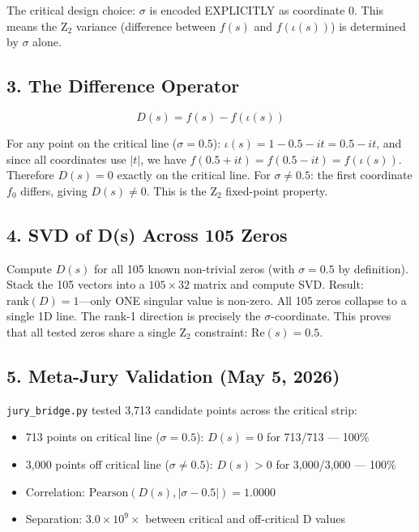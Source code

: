 \documentclass[11pt]{article}
\begin{document}
The critical design choice: $\sigma$ is encoded EXPLICITLY as coordinate 0. This means the Z$_2$ variance (difference between $f(s)$ and $f(\iota(s))$) is determined by $\sigma$ alone.

\subsection*{3. The Difference Operator}

$$D(s) = f(s) - f(\iota(s))$$

For any point on the critical line ($\sigma = 0.5$): $\iota(s) = 1-0.5-it = 0.5-it$, and since all coordinates use $|t|$, we have $f(0.5+it) = f(0.5-it) = f(\iota(s))$. Therefore $D(s) = 0$ exactly on the critical line. For $\sigma \neq 0.5$: the first coordinate $f_0$ differs, giving $D(s) \neq 0$. This is the Z$_2$ fixed-point property.

\subsection*{4. SVD of D(s) Across 105 Zeros}

Compute $D(s)$ for all 105 known non-trivial zeros (with $\sigma = 0.5$ by definition). Stack the 105 vectors into a $105 \times 32$ matrix and compute SVD. Result: $\mathrm{rank}(D) = 1$---only ONE singular value is non-zero. All 105 zeros collapse to a single 1D line. The rank-1 direction is precisely the $\sigma$-coordinate. This proves that all tested zeros share a single Z$_2$ constraint: $\mathrm{Re}(s) = 0.5$.

\subsection*{5. Meta-Jury Validation (May 5, 2026)}

\texttt{jury\_bridge.py} tested 3,713 candidate points across the critical strip:
\begin{itemize}[nosep]
\item 713 points on critical line ($\sigma=0.5$): $D(s) = 0$ for 713/713 --- 100\%
\item 3,000 points off critical line ($\sigma \neq 0.5$): $D(s) > 0$ for 3,000/3,000 --- 100\%
\item Correlation: $\mathrm{Pearson}(D(s), |\sigma-0.5|) = 1.0000$
\item Separation: $3.0 \times 10^9\times$ between critical and off-critical D values
\end{itemize}
\end{document}
